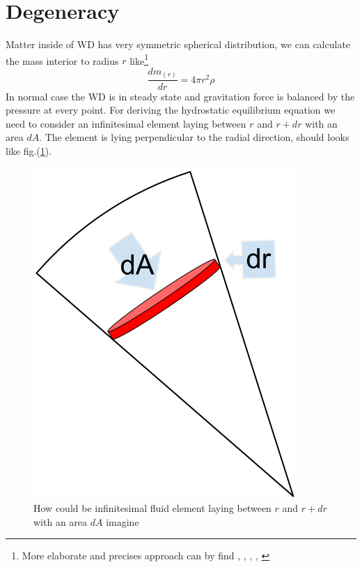 \documentclass[oneside,a4paper,11pt]{report}
\begin{document}
\section{Degeneracy}
Matter inside of WD has very symmetric spherical distribution, we can calculate the mass interior to radius $r$ like\footnote{More elaborate and precises approach can by find 
\citet{2004bhwd.book.....S}, \cite{padm_vII}, \citet{kleczek}, \citet{comp_obj1}, \citet{1972ApJ...175..417N}}
\begin{equation}
 \frac{dm_{(r)}}{dr} = 4 \pi r^2 \rho
\end{equation}
In normal case the WD is in steady state and gravitation force is balanced by the pressure at every point.  
For deriving the hydrostatic equilibrium equation we need to consider an infinitesimal element laying between 
$r$ and $r+dr$ with an area $dA$. The element is lying perpendicular to the radial direction, should looks like fig.(\ref{wd1}).
\begin{figure}[!hbt]
\centering
\includegraphics[totalheight=4cm]{plot/wd1}
\caption{How could be infinitesimal fluid element laying between 
$r$ and $r+dr$ with an area $dA$ imagine}
\label{wd1} 
\end{figure}
\end{document}
